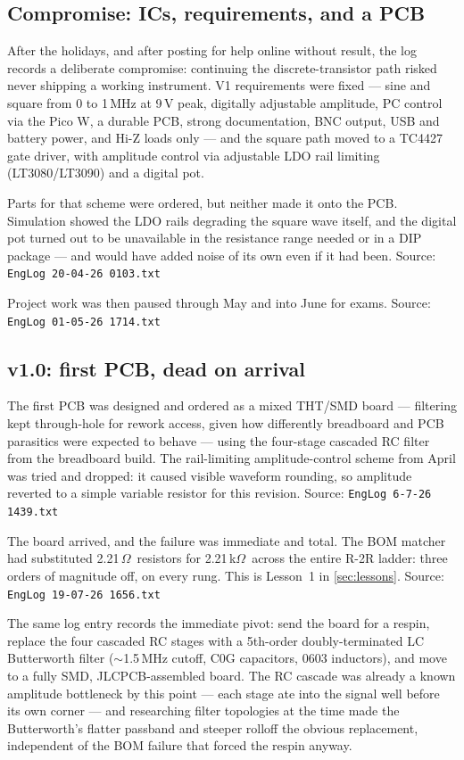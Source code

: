 \documentclass[11pt,a4paper]{article}
\newcommand{\ohm}{\ensuremath{\Omega}}
\newcommand{\srcfile}[1]{\hfill{\footnotesize\color{muted}Source: \texttt{#1}}}
\begin{document}
\subsection{Compromise: ICs, requirements, and a PCB}
\label{sec:compromise}

After the holidays, and after posting for help online without result, the log records a
deliberate compromise: continuing the discrete-transistor path risked never shipping a
working instrument. V1 requirements were fixed --- sine and square from 0 to 1\,MHz at
9\,V peak, digitally adjustable amplitude, PC control via the Pico W, a durable PCB,
strong documentation, BNC output, USB and battery power, and Hi-Z loads only --- and the
square path moved to a TC4427 gate driver, with amplitude control via adjustable LDO rail
limiting (LT3080/LT3090) and a digital pot.

Parts for that scheme were ordered, but neither made it onto the PCB. Simulation showed
the LDO rails degrading the square wave itself, and the digital pot turned out to be
unavailable in the resistance range needed or in a DIP package --- and would have added
noise of its own even if it had been. \srcfile{EngLog 20-04-26 0103.txt}

Project work was then paused through May and into June for exams.
\srcfile{EngLog 01-05-26 1714.txt}

\subsection{v1.0: first PCB, dead on arrival}
\label{sec:v1.0}

The first PCB was designed and ordered as a mixed THT/SMD board --- filtering kept
through-hole for rework access, given how differently breadboard and PCB parasitics were
expected to behave --- using the four-stage cascaded RC filter from the breadboard build.
The rail-limiting amplitude-control scheme from April was tried and dropped: it caused
visible waveform rounding, so amplitude reverted to a simple variable resistor for this
revision. \srcfile{EngLog 6-7-26 1439.txt}

The board arrived, and the failure was immediate and total. The BOM matcher had
substituted 2.21\,\ohm\ resistors for 2.21\,k\ohm\ across the entire R-2R ladder: three
orders of magnitude off, on every rung. This is Lesson~1 in \cref{sec:lessons}.
\srcfile{EngLog 19-07-26 1656.txt}

The same log entry records the immediate pivot: send the board for a respin, replace the
four cascaded RC stages with a 5th-order doubly-terminated LC Butterworth filter
($\sim$1.5\,MHz cutoff, C0G capacitors, 0603 inductors), and move to a fully SMD,
JLCPCB-assembled board. The RC cascade was already a known amplitude bottleneck by this
point --- each stage ate into the signal well before its own corner --- and researching
filter topologies at the time made the Butterworth's flatter passband and steeper rolloff
the obvious replacement, independent of the BOM failure that forced the respin anyway.
\end{document}
